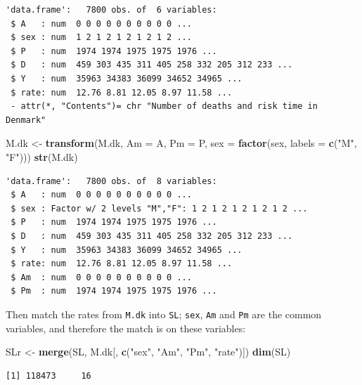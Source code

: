 \documentclass[
]{book}
\newenvironment{Shaded}{\begin{snugshade}}{\end{snugshade}}
\newcommand{\AttributeTok}[1]{\textcolor[rgb]{0.13,0.29,0.53}{#1}}
\newcommand{\FunctionTok}[1]{\textcolor[rgb]{0.13,0.29,0.53}{\textbf{#1}}}
\newcommand{\NormalTok}[1]{#1}
\newcommand{\OtherTok}[1]{\textcolor[rgb]{0.56,0.35,0.01}{#1}}
\newcommand{\StringTok}[1]{\textcolor[rgb]{0.31,0.60,0.02}{#1}}
\theoremstyle{definition}
\theoremstyle{definition}
\theoremstyle{definition}
\theoremstyle{definition}
\theoremstyle{remark}
\begin{document}
\begin{enumerate}
\begin{verbatim}
'data.frame':   7800 obs. of  6 variables:
 $ A   : num  0 0 0 0 0 0 0 0 0 0 ...
 $ sex : num  1 2 1 2 1 2 1 2 1 2 ...
 $ P   : num  1974 1974 1975 1975 1976 ...
 $ D   : num  459 303 435 311 405 258 332 205 312 233 ...
 $ Y   : num  35963 34383 36099 34652 34965 ...
 $ rate: num  12.76 8.81 12.05 8.97 11.58 ...
 - attr(*, "Contents")= chr "Number of deaths and risk time in Denmark"
\end{verbatim}

\begin{Shaded}
\begin{Highlighting}[]
\NormalTok{M.dk }\OtherTok{\textless{}{-}} \FunctionTok{transform}\NormalTok{(M.dk,}
                  \AttributeTok{Am =}\NormalTok{ A,}
                  \AttributeTok{Pm =}\NormalTok{ P,}
                 \AttributeTok{sex =} \FunctionTok{factor}\NormalTok{(sex, }\AttributeTok{labels =} \FunctionTok{c}\NormalTok{(}\StringTok{"M"}\NormalTok{, }\StringTok{"F"}\NormalTok{)))}
\FunctionTok{str}\NormalTok{(M.dk)}
\end{Highlighting}
\end{Shaded}

\begin{verbatim}
'data.frame':   7800 obs. of  8 variables:
 $ A   : num  0 0 0 0 0 0 0 0 0 0 ...
 $ sex : Factor w/ 2 levels "M","F": 1 2 1 2 1 2 1 2 1 2 ...
 $ P   : num  1974 1974 1975 1975 1976 ...
 $ D   : num  459 303 435 311 405 258 332 205 312 233 ...
 $ Y   : num  35963 34383 36099 34652 34965 ...
 $ rate: num  12.76 8.81 12.05 8.97 11.58 ...
 $ Am  : num  0 0 0 0 0 0 0 0 0 0 ...
 $ Pm  : num  1974 1974 1975 1975 1976 ...
\end{verbatim}

  Then match the rates from \texttt{M.dk} into \texttt{SL};
  \texttt{sex}, \texttt{Am} and \texttt{Pm} are the common variables,
  and therefore the match is on these variables:

\begin{Shaded}
\begin{Highlighting}[]
\NormalTok{SLr }\OtherTok{\textless{}{-}} \FunctionTok{merge}\NormalTok{(SL,}
\NormalTok{             M.dk[, }\FunctionTok{c}\NormalTok{(}\StringTok{"sex"}\NormalTok{, }\StringTok{"Am"}\NormalTok{, }\StringTok{"Pm"}\NormalTok{, }\StringTok{"rate"}\NormalTok{)])}
\FunctionTok{dim}\NormalTok{(SL)}
\end{Highlighting}
\end{Shaded}

\begin{verbatim}
[1] 118473     16
\end{verbatim}


\end{enumerate}
\end{document}
